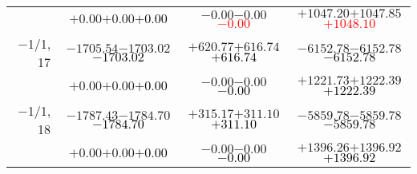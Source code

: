 \documentclass[compress]{beamer}
\begin{document}
\begin{frame}
{\begin{tabular}{r | c | c | c}
           & $+0.00$\hspace{0.1 cm}$+0.00$\hspace{0.1 cm}\textcolor{black}{$+0.00$} & $-0.00$\hspace{0.1 cm}$-0.00$\hspace{0.1 cm}\textcolor{red}{$-0.00$} & $+1047.20$\hspace{0.1 cm}$+1047.85$\hspace{0.1 cm}\textcolor{red}{$+1048.10$} \\
$-$1/1, 17 & $-1705.54$\hspace{0.1 cm}$-1703.02$\hspace{0.1 cm}\textcolor{black}{$-1703.02$} & $+620.77$\hspace{0.1 cm}$+616.74$\hspace{0.1 cm}\textcolor{black}{$+616.74$} & $-6152.78$\hspace{0.1 cm}$-6152.78$\hspace{0.1 cm}\textcolor{black}{$-6152.78$} \\
           & $+0.00$\hspace{0.1 cm}$+0.00$\hspace{0.1 cm}\textcolor{black}{$+0.00$} & $-0.00$\hspace{0.1 cm}$-0.00$\hspace{0.1 cm}\textcolor{black}{$-0.00$} & $+1221.73$\hspace{0.1 cm}$+1222.39$\hspace{0.1 cm}\textcolor{black}{$+1222.39$} \\
$-$1/1, 18 & $-1787.43$\hspace{0.1 cm}$-1784.70$\hspace{0.1 cm}\textcolor{black}{$-1784.70$} & $+315.17$\hspace{0.1 cm}$+311.10$\hspace{0.1 cm}\textcolor{black}{$+311.10$} & $-5859.78$\hspace{0.1 cm}$-5859.78$\hspace{0.1 cm}\textcolor{black}{$-5859.78$} \\
           & $+0.00$\hspace{0.1 cm}$+0.00$\hspace{0.1 cm}\textcolor{black}{$+0.00$} & $-0.00$\hspace{0.1 cm}$-0.00$\hspace{0.1 cm}\textcolor{black}{$-0.00$} & $+1396.26$\hspace{0.1 cm}$+1396.92$\hspace{0.1 cm}\textcolor{black}{$+1396.92$} \\
\end{tabular}}
\end{frame}
\end{document}
